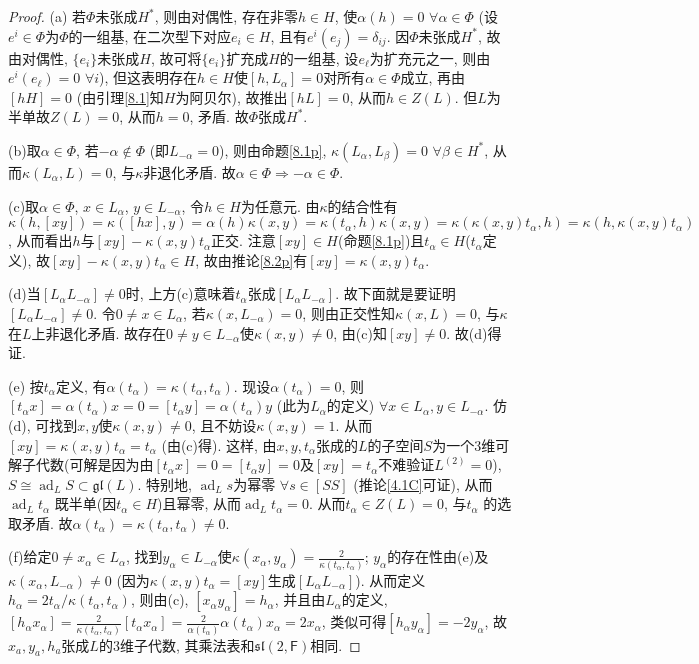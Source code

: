 \documentclass{ctexart}%
\theoremstyle{definition}
\theoremstyle{remark}
\DeclareMathOperator{\ad}{ad}
\begin{document}
\begin{proof}
(a) 若$\Phi$未张成$H^*$, 则由对偶性, 存在非零$h\in H$, 使$\alpha(h)=0\,\,\forall \alpha\in \Phi$ (设$e^i\in\Phi$为$\Phi$的一组基, 在二次型下对应$e_i\in H$, 且有$e^i(e_j)=\delta_{ij}$. 因$\Phi$未张成$H^*$, 故由对偶性, $\{e_i\}$未张成$H$, 故可将$\{e_i\}$扩充成$H$的一组基, 设$e_\ell$为扩充元之一, 则由$e^i(e_\ell)=0$ $\forall i$), 但这表明存在$h\in H$使$[h,L_\alpha]=0$对所有$\alpha \in \Phi$成立, 再由$[hH]=0$ (由引理\ref{8.1}知$H$为阿贝尔), 故推出$[hL]=0$, 从而$h\in Z(L)$. 但$L$为半单故$Z(L)=0$, 从而$h=0$, 矛盾. 故$\Phi$张成$H^*$.

(b)取$\alpha \in \Phi$, 若$-\alpha \notin \Phi$ (即$L_{-\alpha}=0$), 则由命题\ref{8.1p}, $\kappa(L_\alpha,L_\beta)=0$ $\forall \beta \in H^*$, 从而$\kappa(L_\alpha,L)=0$, 与$\kappa$非退化矛盾. 故$\alpha\in \Phi\Rightarrow -\alpha \in \Phi$.

(c)取$\alpha \in\Phi$, $x\in L_\alpha$, $y\in L_{-\alpha}$, 令$h\in H$为任意元. 由$\kappa$的结合性有$\kappa(h,[xy])=\kappa([hx],y)=\alpha(h)\kappa(x,y) = \kappa(t_\alpha,h)\kappa(x,y)=\kappa(\kappa(x,y)t_\alpha,h)=\kappa(h,\kappa(x,y)t_\alpha)$, 从而看出$h$与$[xy]-\kappa(x,y)t_\alpha$正交. 注意$[xy]\in H$(命题\ref{8.1p})且$t_\alpha \in H$($t_\alpha$定义), 故$[xy]-\kappa(x,y)t_\alpha\in H$, 故由推论\ref{8.2p}有$[xy]=\kappa(x,y)t_\alpha$.

(d)$当[L_\alpha L_{-\alpha}]\neq0$时, 上方(c)意味着$t_\alpha$张成$[L_\alpha L_{-\alpha}]$. 故下面就是要证明$[L_\alpha L_{-\alpha}]\neq 0$. 令$0\neq x\in L_\alpha$, 若$\kappa(x,L_{-\alpha})=0$, 则由正交性知$\kappa(x,L)=0$, 与$\kappa$在$L$上非退化矛盾. 故存在$0\neq y\in L_{-\alpha}$使$\kappa(x,y)\neq 0$, 由(c)知$[xy]\neq 0$. 故(d)得证.

(e) 按$t_\alpha$定义, 有$\alpha(t_\alpha)=\kappa(t_\alpha,t_\alpha)$. 现设$\alpha(t_\alpha)=0$, 则$[t_\alpha x]=\alpha(t_\alpha)x=0=[t_\alpha y]=\alpha(t_\alpha)y$ (此为$L_\alpha$的定义) $\forall x\in L_\alpha, y\in L_{-\alpha}$. 仿(d), 可找到$x,y$使$\kappa(x,y)\neq 0$, 且不妨设$\kappa(x,y)=1$. 从而$[xy]=\kappa(x,y)t_\alpha=t_\alpha$ (由(c)得). 这样, 由$x,y,t_\alpha$张成的$L$的子空间$S$为一个3维可解子代数(可解是因为由$[t_\alpha x]=0=[t_\alpha y]=0$及$[xy]=t_\alpha$不难验证$L^{(2)}=0$), $S\cong \ad_L S\subset \mathfrak{gl}(L)$. 特别地, $\ad_L s$为幂零 $\forall s \in [SS]$ (推论\ref{4.1C}可证), 从而$\ad_Lt_\alpha$ 既半单(因$t_\alpha \in H$)且幂零, 从而$\ad_L t_\alpha=0$. 从而$t_\alpha \in Z(L)=0$, 与$t_\alpha$ 的选取矛盾. 故$\alpha(t_\alpha)=\kappa(t_\alpha,t_\alpha)\neq 0$.

(f)给定$0\neq x_\alpha \in L_\alpha$, 找到$y_\alpha \in L_{-\alpha}$使$\kappa(x_\alpha,y_\alpha) = \frac{2}{\kappa(t_\alpha,t_\alpha)}$; $y_\alpha$的存在性由(e)及$\kappa(x_\alpha,L_{-\alpha})\neq 0$ (因为$\kappa(x,y)t_\alpha=[xy]$生成$[L_\alpha L_{-\alpha}]$). 从而定义$h_\alpha=2t_\alpha/\kappa(t_\alpha,t_\alpha)$, 则由(c), $[x_\alpha y_\alpha]=h_\alpha$, 并且由$L_\alpha$的定义, $[h_\alpha x_\alpha] = \frac{2}{\kappa(t_\alpha,t_\alpha)}[t_\alpha x_\alpha] =  \frac{2}{\alpha(t_\alpha)} \alpha(t_\alpha) x_\alpha= 2 x_\alpha$, 类似可得$[h_\alpha y_\alpha] = - 2 y_\alpha$, 故$x_a,y_a,h_a$张成$L$的3维子代数, 其乘法表和$\mathfrak{sl}(2,\mathsf{F})$相同. 


\end{proof}
\end{document}
